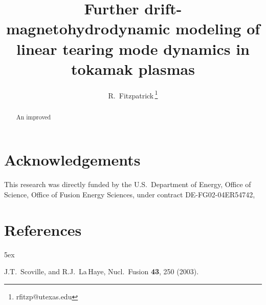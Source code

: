 \documentclass[12pt,prb,aps]{revtex4-1}
\begin{document}
\title{Further drift-magnetohydrodynamic modeling of linear tearing mode dynamics in tokamak plasmas}

\author{R.~Fitzpatrick\,\footnote{rfitzp@utexas.edu}}

\begin{abstract}
An improved 
\end{abstract}

\maketitle

\section*{Acknowledgements}
This research was directly funded by the U.S.\ Department of Energy, Office of Science, Office of Fusion Energy Sciences,  under contract DE-FG02-04ER54742, 

\section*{References}
\begin{thebibliography}{99}\baselineskip 5ex

 J.T.~Scoville, and R.J.~La\,Haye, Nucl.\ Fusion {\bf 43}, 250 (2003).
\end{thebibliography}

\end{document}
